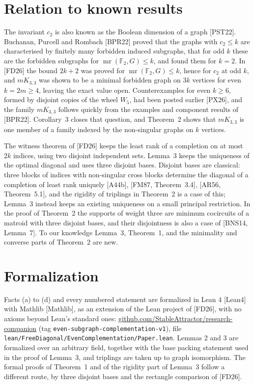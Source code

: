 \documentclass[11pt,letterpaper,reqno]{amsart}
\theoremstyle{spaced}
\begin{document}
\hypertarget{relation-to-known-results}{%
\section{Relation to known results}\label{relation-to-known-results}}

The invariant \(c_2\) is also known as the Boolean dimension of a graph {[}PST22{]}. Buchanan, Purcell and Rombach {[}BPR22{]} proved that the graphs with \(c_2 \le k\) are characterised by finitely many forbidden induced subgraphs, that for odd \(k\) these are the forbidden subgraphs for \(\operatorname{mr}(\mathbb{F}_2, G) \le k\), and found them for \(k = 2\). In {[}FD26{]} the bound \(2k+2\) was proved for \(\operatorname{mr}(\mathbb{F}_2, G) \le k\), hence for \(c_2\) at odd \(k\), and \(mK_{3,3}\) was shown to be a minimal forbidden graph on \(3k\) vertices for even \(k = 2m \ge 4\), leaving the exact value open. Counterexamples for even \(k \ge 6\), formed by disjoint copies of the wheel \(W_5\), had been posted earlier {[}PX26{]}, and the family \(mK_{3,3}\) follows quickly from the examples and component results of {[}BPR22{]}. Corollary~3 closes that question, and Theorem~2 shows that \(mK_{3,3}\) is one member of a family indexed by the non-singular graphs on \(k\) vertices.

The witness theorem of {[}FD26{]} keeps the least rank of a completion on at most \(2k\) indices, using two disjoint independent sets. Lemma~3 keeps the uniqueness of the optimal diagonal and uses three disjoint bases. Disjoint bases are classical: three blocks of indices with non-singular cross blocks determine the diagonal of a completion of least rank uniquely {[}A44b{]}, {[}FM87, Theorem~3.4{]}, {[}AR56, Theorem~5.1{]}, and the rigidity of triplings in Theorem~2 is a case of this; Lemma~3 instead keeps an existing uniqueness on a small principal restriction. In the proof of Theorem~2 the supports of weight three are minimum cocircuits of a matroid with three disjoint bases, and their disjointness is also a case of {[}BNS14, Lemma~7{]}. To our knowledge Lemma~3, Theorem~1, and the minimality and converse parts of Theorem~2 are new.

\newpage\hypertarget{formalization}{%
\section{Formalization}\label{formalization}}

Facts (a) to (d) and every numbered statement are formalized in Lean 4 {[}Lean4{]} with Mathlib {[}Mathlib{]}, as an extension of the Lean project of {[}FD26{]}, with no axioms beyond Lean's standard ones: \href{https://github.com/StableAttractor/research-companion/tree/even-subgraph-complementation-v1}{github.com/StableAttractor/research-companion} (tag \texttt{even-subgraph-complementation-v1}), file \texttt{lean/FreeDiagonal/EvenComplementation/Paper.lean}. Lemmas 2 and 3 are formalized over an arbitrary field, together with the base packing statement used in the proof of Lemma~3, and triplings are taken up to graph isomorphism. The formal proofs of Theorem~1 and of the rigidity part of Lemma~3 follow a different route, by three disjoint bases and the rectangle comparison of {[}FD26{]}.
\end{document}
